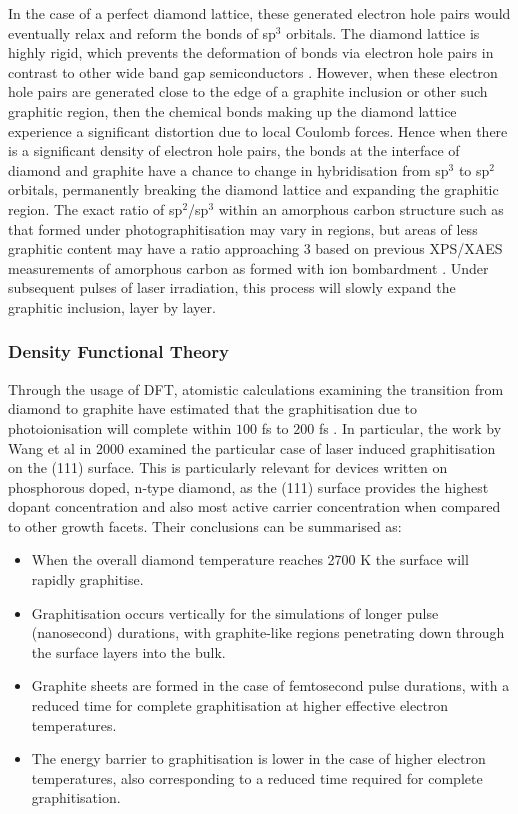 \begin{refsection}
In the case of a perfect diamond lattice, these generated electron hole pairs would eventually relax and reform the  bonds of sp$^{3}$ orbitals. The diamond lattice is highly rigid, which prevents the deformation of bonds via electron hole pairs in contrast to other wide band gap semiconductors \cite{martin:1997}. However, when these electron hole pairs are generated close to the edge of a graphite inclusion or other such graphitic region, then the chemical bonds making up the diamond lattice experience a significant distortion due to local Coulomb forces. Hence when there is a significant density of electron hole pairs, the  bonds at the interface of diamond and graphite have a chance to change in hybridisation from sp$^{3}$ to sp$^{2}$ orbitals, permanently breaking the diamond lattice and expanding the graphitic region. The exact ratio of sp$^{2}$/sp$^{3}$ within an amorphous carbon structure such as that formed under photographitisation may vary in regions, but areas of less graphitic content may have a ratio approaching 3 based on previous XPS/XAES measurements of amorphous carbon as formed with ion bombardment \cite{lascovich:1991}. Under subsequent pulses of laser irradiation, this process will slowly expand the graphitic inclusion, layer by layer.

\subsubsection{Density Functional Theory}
Through the usage of DFT, atomistic calculations examining the transition from diamond to graphite have estimated that the graphitisation due to photoionisation will complete within $100$ \si{\femto\second} \cite{jeschke:1999} to $200$ \si{\femto\second} \cite{wang:2000}. In particular, the work by Wang et al in 2000 examined the particular case of laser induced graphitisation on the (111) surface. This is particularly relevant for devices written on phosphorous doped, n-type diamond, as the (111) surface provides the highest dopant concentration and also most active carrier concentration when compared to other growth facets. Their conclusions can be summarised as:

\begin{itemize}
	\item When the overall diamond temperature reaches 2700 \si{\kelvin} the surface will rapidly graphitise.
	\item Graphitisation occurs vertically for the simulations of longer pulse (nanosecond) durations, with graphite-like regions penetrating down through the surface layers into the bulk.
	\item Graphite sheets are formed in the case of femtosecond pulse durations, with a reduced time for complete graphitisation at higher effective electron temperatures.
	\item The energy barrier to graphitisation is lower in the case of higher electron temperatures, also corresponding to a reduced time required for complete graphitisation.
\end{itemize}


\end{refsection}
